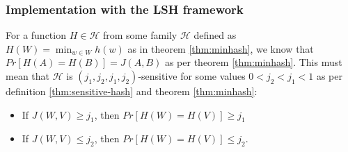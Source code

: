 \subsubsection{Implementation with the LSH framework}
For a function $H\in \mathcal{H}$ from some family $\mathcal{H}$ defined as $H(W)=\min_{w\in W}h(w)$ as in theorem \ref{thm:minhash}, we know that $Pr[H(A)=H(B)]=J(A,B)$ as per theorem \ref{thm:minhash}. This must mean that $\mathcal{H}$ is $(j_1, j_2, j_1, j_2)$-sensitive for some values $0< j_2 < j_1 < 1$ as per definition \ref{thm:sensitive-hash} and theorem \ref{thm:minhash}:
\begin{itemize}
    \item If $J(W,V)\geq j_1$, then $Pr[H(W)=H(V)]\geq j_1$ 
    \item If $J(W,V) \leq j_2$, then $Pr[H(W)=H(V)] \leq j_2$.
\end{itemize}

